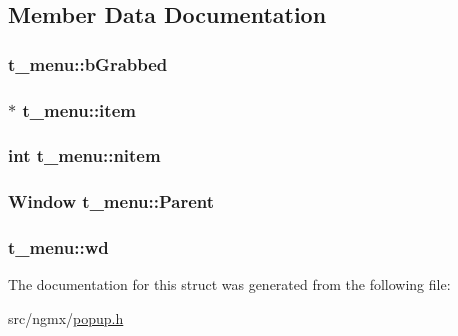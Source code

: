 \subsection{\-Member \-Data \-Documentation}
\hypertarget{structt__menu_aeeb6a68461bb330c64137211a4114fd6}{
\subsubsection[{b\-Grabbed}]{ {\bf t\-\_\-menu\-::b\-Grabbed}}}\label{structt__menu_aeeb6a68461bb330c64137211a4114fd6}
\hypertarget{structt__menu_a6451658b45184306266c3be02f578cf1}{
\subsubsection[{item}]{$\ast$ {\bf t\-\_\-menu\-::item}}}\label{structt__menu_a6451658b45184306266c3be02f578cf1}
\hypertarget{structt__menu_ac8235161b3b5e70c8d65e4153ddf4a36}{
\subsubsection[{nitem}]{\setlength{\rightskip}{0pt plus 5cm}int {\bf t\-\_\-menu\-::nitem}}}\label{structt__menu_ac8235161b3b5e70c8d65e4153ddf4a36}
\hypertarget{structt__menu_a73ff7e7653f9f4fb9af5617fd953b327}{
\subsubsection[{\-Parent}]{\setlength{\rightskip}{0pt plus 5cm}\-Window {\bf t\-\_\-menu\-::\-Parent}}}\label{structt__menu_a73ff7e7653f9f4fb9af5617fd953b327}
\hypertarget{structt__menu_a5393542f75525e3bd0def5612c201fac}{
\subsubsection[{wd}]{ {\bf t\-\_\-menu\-::wd}}}\label{structt__menu_a5393542f75525e3bd0def5612c201fac}


\-The documentation for this struct was generated from the following file\-:\begin{DoxyCompactItemize}
\item 
src/ngmx/\hyperlink{popup_8h}{popup.\-h}\end{DoxyCompactItemize}
